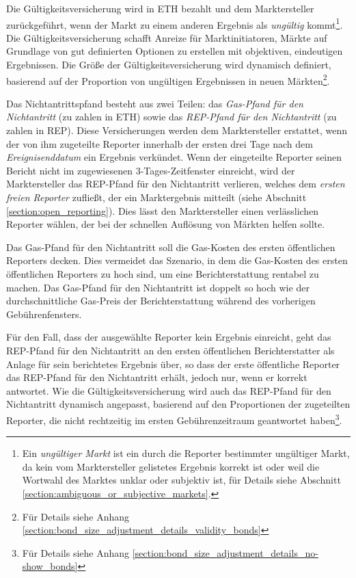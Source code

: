 \documentclass[floatfix,reprint,nofootinbib,amsmath,amssymb,epsfig,pre,floats,letterpaper,groupedaffiliation]{revtex4-1}
\theoremstyle{definition}
\theoremstyle{definition}
\theoremstyle{definition}
\begin{document}
Die Gültigkeitsversicherung wird in ETH bezahlt und dem Marktersteller zurückgeführt, wenn der Markt zu einem anderen Ergebnis als \textit{ungültig} kommt\footnote{Ein \textit{ungültiger Markt} ist ein durch die Reporter bestimmter ungültiger Markt, da kein vom Marktersteller gelistetes Ergebnis korrekt ist oder weil die Wortwahl des Marktes unklar oder subjektiv ist, für Details siehe Abschnitt \ref{section:ambiguous_or_subjective_markets}.}. Die Gültigkeitsversicherung schafft Anreize für Marktinitiatoren, Märkte auf Grundlage von gut definierten Optionen zu erstellen mit objektiven, eindeutigen Ergebnissen. Die Größe der Gültigkeitsversicherung wird dynamisch definiert, basierend auf der Proportion von ungültigen Ergebnissen in neuen Märkten\footnote{Für Details siehe Anhang \ref{section:bond_size_adjustment_details_validity_bonds}}.

Das Nichtantrittspfand besteht aus zwei Teilen: das \textit{Gas-Pfand für den Nichtantritt} (zu zahlen in ETH) sowie das \textit{REP-Pfand für den Nichtantritt} (zu zahlen in REP). Diese Versicherungen werden dem Marktersteller erstattet, wenn der von ihm zugeteilte Reporter innerhalb der ersten drei Tage nach dem \textit{Ereignisenddatum} ein Ergebnis verkündet. Wenn der eingeteilte Reporter seinen Bericht nicht im zugewiesenen 3-Tages-Zeitfenster einreicht, wird der Marktersteller das REP-Pfand für den Nichtantritt verlieren, welches dem \textit{ersten freien Reporter} zufließt, der ein Marktergebnis mitteilt (siehe Abschnitt \ref{section:open_reporting}). Dies lässt den Marktersteller einen verlässlichen Reporter wählen, der bei der schnellen Auflösung von Märkten helfen sollte.

Das Gas-Pfand für den Nichtantritt soll die Gas-Kosten des ersten öffentlichen Reporters decken. Dies vermeidet das Szenario, in dem die Gas-Kosten des ersten öffentlichen Reporters zu hoch sind, um eine Berichterstattung rentabel zu machen. Das Gas-Pfand für den Nichtantritt ist doppelt so hoch wie der durchschnittliche Gas-Preis der Berichterstattung während des vorherigen Gebührenfensters. 

Für den Fall, dass der ausgewählte Reporter kein Ergebnis einreicht, geht das REP-Pfand für den Nichtantritt an den ersten öffentlichen Berichterstatter als Anlage für sein berichtetes Ergebnis über, so dass der erste öffentliche Reporter das REP-Pfand für den Nichtantritt erhält, jedoch nur, wenn er korrekt antwortet. Wie die Gültigkeitsversicherung wird auch das REP-Pfand für den Nichtantritt dynamisch angepasst, basierend auf den Proportionen der zugeteilten Reporter, die nicht rechtzeitig im ersten Gebührenzeitraum geantwortet haben\footnote{Für Details siehe Anhang  \ref{section:bond_size_adjustment_details_no-show_bonds}}.
\end{document}
